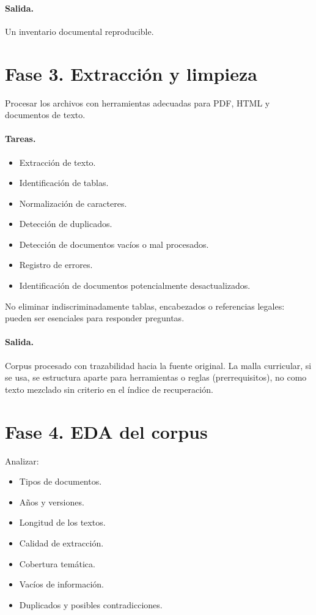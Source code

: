 \documentclass[11pt,a4paper]{article}
\begin{document}
\paragraph{Salida.}
Un inventario documental reproducible.

\section{Fase 3. Extracción y limpieza}

Procesar los archivos con herramientas adecuadas para PDF, HTML y documentos de texto.

\paragraph{Tareas.}
\begin{itemize}
  \item Extracción de texto.
  \item Identificación de tablas.
  \item Normalización de caracteres.
  \item Detección de duplicados.
  \item Detección de documentos vacíos o mal procesados.
  \item Registro de errores.
  \item Identificación de documentos potencialmente desactualizados.
\end{itemize}

No eliminar indiscriminadamente tablas, encabezados o referencias legales: pueden ser esenciales para responder preguntas.

\paragraph{Salida.}
Corpus procesado con trazabilidad hacia la fuente original. La malla curricular, si se usa, se estructura aparte para herramientas o reglas (prerrequisitos), no como texto mezclado sin criterio en el índice de recuperación.

\section{Fase 4. EDA del corpus}

Analizar:

\begin{itemize}
  \item Tipos de documentos.
  \item Años y versiones.
  \item Longitud de los textos.
  \item Calidad de extracción.
  \item Cobertura temática.
  \item Vacíos de información.
  \item Duplicados y posibles contradicciones.
\end{itemize}
\end{document}
